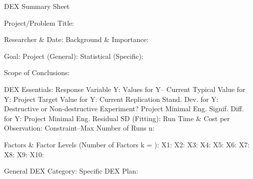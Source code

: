                                      DEX Summary Sheet
 
Project/Problem Title:
 
Researcher & Date:
Background & Importance:
 
 
 
Goal:
      Project (General):
      Statistical (Specific):
 
 
 
Scope of Conclusions:
 
DEX Essentials:
      Response Variable Y:
      Values for Y--
            Current Typical Value for Y:
            Project Target Value for Y:
            Current Replication Stand. Dev. for Y:
            Destructive or Non-destructive Experiment?
            Project Minimal Eng. Signif. Diff. for Y:
            Project Minimal Eng. Residual SD (Fitting):
      Run Time & Cost per Observation:
      Constraint--Max Number of Runs n:
 
Factors & Factor Levels (Number of Factors k =       ):
      X1:
      X2:
      X3:
      X4:
      X5:
      X6:
      X7:
      X8:
      X9:
     X10:
 
General DEX Category:
Specific DEX Plan:
